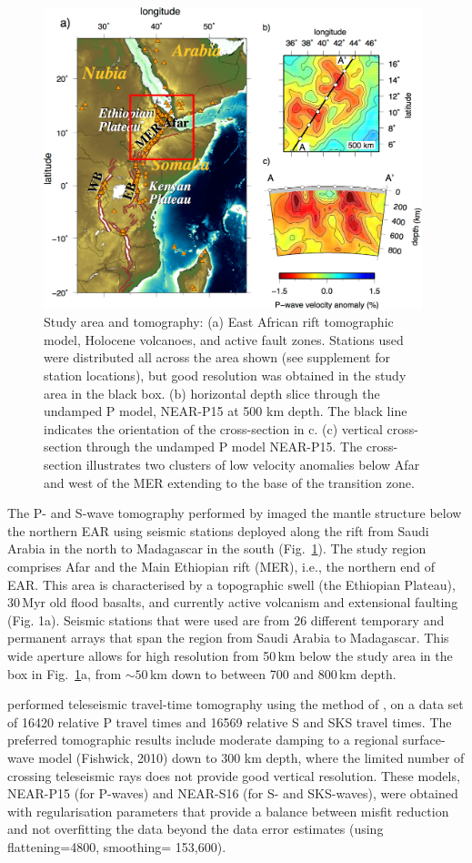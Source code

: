 \documentclass[a4paper,10pt,twocolumn]{paper}
\begin{document}
\begin{figure}
\centering
\includegraphics[width=11cm]{../figures-working/fig01.png}
\caption{Study area and tomography: (a) East African rift tomographic model, Holocene volcanoes, and active fault zones. Stations used were distributed all across the area shown (see supplement for station locations), but good resolution was obtained in the study area in the black box. (b) horizontal depth slice through the undamped P model, NEAR-P15 at 500 km depth. The black line indicates the orientation of the cross-section in c. (c) vertical cross-section through the undamped P model NEAR-P15. The cross-section illustrates two clusters of low velocity anomalies below Afar and west of the MER extending to the base of the transition zone.}
\label{fg:1}
\end{figure}

The P- and S-wave tomography performed by \cite{civiero-etal-2015,civiero-etal-2016} imaged the mantle structure below the northern EAR using seismic stations deployed along the rift from Saudi Arabia in the north to Madagascar in the south (Fig.~\ref{fg:1}). The study region comprises Afar and the Main Ethiopian rift (MER), i.e., the northern end of EAR. This area is characterised by a topographic swell (the Ethiopian Plateau), 30\,Myr old flood basalts, and currently active volcanism and extensional faulting (Fig. 1a). Seismic stations that were used are from 26 different temporary and permanent arrays that span the region from Saudi Arabia to Madagascar. This wide aperture allows for high resolution from 50\,km below the study area in the box in Fig.~\ref{fg:1}a, from $\sim50$\,km down to between 700 and 800\,km depth.

\cite{civiero-etal-2015,civiero-etal-2016} performed teleseismic travel-time tomography using the method of \cite{vandecar-etal-1995}, on a data set of 16420 relative P travel times and 16569 relative S and SKS travel times. The preferred tomographic results include moderate damping to a regional surface-wave model (Fishwick, 2010) down to 300 km depth, where the limited number of crossing teleseismic rays does not provide good vertical resolution. These models, NEAR-P15 (for P-waves) and NEAR-S16 (for S- and SKS-waves), were obtained with regularisation parameters that provide a balance between misfit reduction and not overfitting the data beyond the data error estimates (using flattening=4800, smoothing= 153,600).
\end{document}
